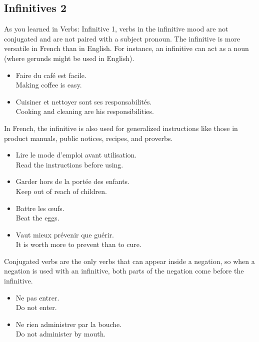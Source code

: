 \pagebreak
\subsection{Infinitives 2}

As you learned in Verbs: Infinitive 1, verbs in the infinitive mood are not conjugated and are not paired with a subject pronoun. The infinitive is more versatile in French than in English. For instance, an infinitive can act as a noun (where gerunds might be used in English).

\begin{itemize}
  \item  Faire du caf{\'e} est facile. \\ Making coffee is easy.
	\item  Cuisiner et nettoyer sont ses responsabilit{\'e}s. \\ Cooking and cleaning are his responsibilities.
\end{itemize}

In French, the infinitive is also used for generalized instructions like those in product manuals, public notices, recipes, and proverbs.

\begin{itemize}
  \item  Lire le mode d'emploi avant utilisation. \\ Read the instructions before using.
	\item  Garder hors de la port{\'e}e des enfants. \\ Keep out of reach of children.
	\item  Battre les {\oe}ufs. \\ Beat the eggs.
	\item  Vaut mieux pr{\'e}venir que gu{\'e}rir. \\ It is worth more to prevent than to cure.
\end{itemize}

Conjugated verbs are the only verbs that can appear inside a negation, so when a negation is used with an infinitive, both parts of the negation come before the infinitive.

\begin{itemize}
  \item  Ne pas entrer. \\ Do not enter.
	\item  Ne rien administrer par la bouche. \\ Do not administer by mouth.
\end{itemize}

